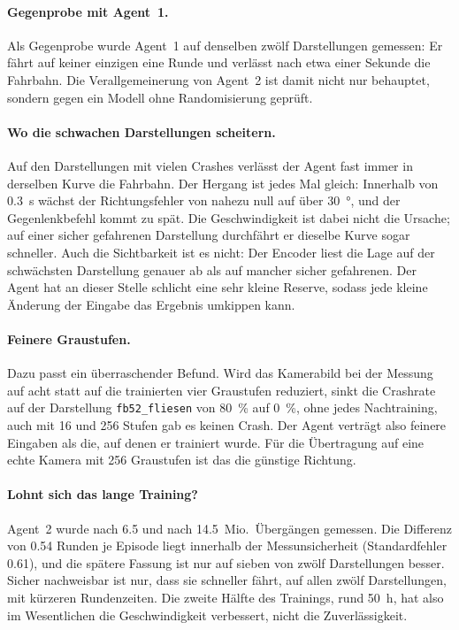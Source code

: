 \paragraph{Gegenprobe mit Agent~1.}
Als Gegenprobe wurde Agent~1 auf denselben zwölf Darstellungen gemessen: Er fährt auf keiner einzigen eine Runde und verlässt nach etwa einer Sekunde die Fahrbahn. Die Verallgemeinerung von Agent~2 ist damit nicht nur behauptet, sondern gegen ein Modell ohne Randomisierung geprüft.

\paragraph{Wo die schwachen Darstellungen scheitern.}
Auf den Darstellungen mit vielen Crashes verlässt der Agent fast immer in derselben Kurve die Fahrbahn. Der Hergang ist jedes Mal gleich: Innerhalb von \SI{0.3}{\second} wächst der Richtungsfehler von nahezu null auf über \SI{30}{\degree}, und der Gegenlenkbefehl kommt zu spät. Die Geschwindigkeit ist dabei nicht die Ursache; auf einer sicher gefahrenen Darstellung durchfährt er dieselbe Kurve sogar schneller. Auch die Sichtbarkeit ist es nicht: Der Encoder liest die Lage auf der schwächsten Darstellung genauer ab als auf mancher sicher gefahrenen. Der Agent hat an dieser Stelle schlicht eine sehr kleine Reserve, sodass jede kleine Änderung der Eingabe das Ergebnis umkippen kann.

\paragraph{Feinere Graustufen.}
Dazu passt ein überraschender Befund. Wird das Kamerabild bei der Messung auf acht statt auf die trainierten vier Graustufen reduziert, sinkt die Crashrate auf der Darstellung \texttt{fb52\_fliesen} von \SI{80}{\percent} auf \SI{0}{\percent}, ohne jedes Nachtraining, auch mit 16 und 256 Stufen gab es keinen Crash. Der Agent verträgt also feinere Eingaben als die, auf denen er trainiert wurde. Für die Übertragung auf eine echte Kamera mit 256 Graustufen ist das die günstige Richtung.

\paragraph{Lohnt sich das lange Training?}
Agent~2 wurde nach \num{6.5} und nach \num{14.5}~Mio.\ Übergängen gemessen. Die Differenz von \num{0.54} Runden je Episode liegt innerhalb der Messunsicherheit (Standardfehler \num{0.61}), und die spätere Fassung ist nur auf sieben von zwölf Darstellungen besser. Sicher nachweisbar ist nur, dass sie schneller fährt, auf allen zwölf Darstellungen, mit kürzeren Rundenzeiten. Die zweite Hälfte des Trainings, rund \SI{50}{\hour}, hat also im Wesentlichen die Geschwindigkeit verbessert, nicht die Zuverlässigkeit.

